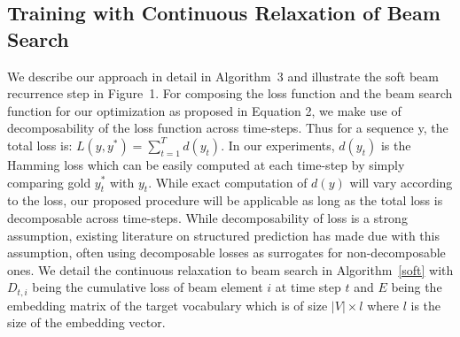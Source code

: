\documentclass[letterpaper]{article} \usepackage{aaai18}  \usepackage{times}  \usepackage{helvet}  \usepackage{courier}  \usepackage{url}  \usepackage{graphicx}  \frenchspacing
\begin{document}
\subsection{Training with Continuous Relaxation of Beam Search \label{sec-soft-beam}}
We describe our approach in detail in Algorithm~3 and illustrate the soft beam recurrence step in Figure~1. For composing the loss function and the beam search function for our optimization as proposed in Equation 2, we make use of decomposability of the loss function across time-steps. Thus for a sequence y, the total loss is: $L(y,y^*) = \sum_{t=1}^T d(y_t)$. In our experiments, $d(y_t)$ is the Hamming loss which can be easily computed at each time-step by simply comparing gold $y_t^*$ with $y_t$. While exact computation of $d(y)$ will vary according to the loss, our proposed procedure will be applicable as long as the total loss is decomposable across time-steps. While decomposability of loss is a strong assumption, existing literature on structured prediction \cite{taskar2004max,tsochantaridis2005large} has made due with this assumption, often using decomposable losses as surrogates for non-decomposable ones. We detail the continuous relaxation to beam search in Algorithm~\ref{soft} with $D_{t,i}$ being the cumulative loss of beam element $i$ at time step $t$ and $E$ being the embedding matrix of the target vocabulary which is of size $|V|\times l$ where $l$ is the size of the embedding vector.
\end{document}
